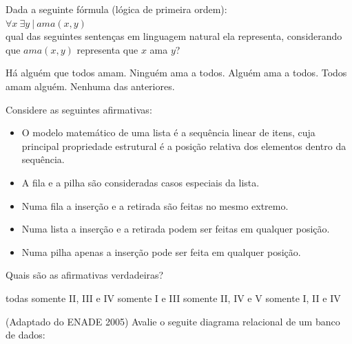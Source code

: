 \documentclass[12pt, addpoints]{exam}
\begin{document}
\begin{questions}
\question

Dada a seguinte fórmula (lógica de primeira ordem):\\

$\forall x \ \exists y \ | \ ama(x,y)$ \\

qual das seguintes sentenças em linguagem natural ela representa, considerando que \( ama(x,y) \) representa que \( x \) ama \( y \)?


\begin{choices}
\choice Há alguém que todos amam.
\choice Ninguém ama a todos.
\choice Alguém ama a todos.
\choice Todos amam alguém.
\choice Nenhuma das anteriores.
\end{choices}

\question

Considere as seguintes afirmativas:

\begin{itemize}

    \item O modelo matemático de uma lista é a sequência linear de itens, cuja principal propriedade estrutural é a posição relativa dos elementos dentro da sequência.

    \item A fila e a pilha são consideradas casos especiais da lista.

    \item Numa fila a inserção e a retirada são feitas no mesmo extremo.

    \item Numa lista a inserção e a retirada podem ser feitas em qualquer posição.

    \item Numa pilha apenas a inserção pode ser feita em qualquer posição.

\end{itemize}



Quais são as afirmativas verdadeiras?
\begin{choices}
\choice todas
\choice somente II, III e IV
\choice somente I e III
\choice somente II, IV e V
\choice somente I, II e IV
\end{choices}

\question

(Adaptado do ENADE 2005) Avalie o seguite diagrama relacional de um banco de dados:

\begin{figure}[H]


\end{figure}
\end{questions}
\end{document}
